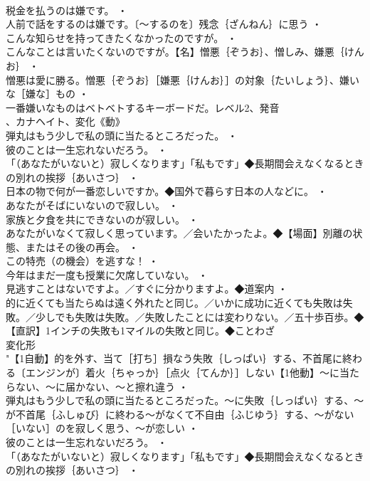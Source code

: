 \documentclass[8pt]{extreport}
\begin{document}
\begin{CJK}{UTF8}{min}
\\	税金を払うのは嫌です。 ・
\\	人前で話をするのは嫌です。〔～するのを〕残念｛ざんねん｝に思う ・
\\	こんな知らせを持ってきたくなかったのですが。 ・
\\	こんなことは言いたくないのですが。【名】憎悪｛ぞうお｝、憎しみ、嫌悪｛けんお｝ ・
\\	憎悪は愛に勝る。憎悪｛ぞうお｝［嫌悪｛けんお｝］の対象｛たいしょう｝、嫌いな［嫌な］もの ・
\\	一番嫌いなものはベトベトするキーボードだ。レベル2、発音
\\	、カナヘイト、変化《動》
\\	弾丸はもう少しで私の頭に当たるところだった。 ・
\\	彼のことは一生忘れないだろう。 ・
\\	「（あなたがいないと）寂しくなります」「私もです」◆長期間会えなくなるときの別れの挨拶｛あいさつ｝ ・
\\	日本の物で何が一番恋しいですか。◆国外で暮らす日本の人などに。 ・
\\	あなたがそばにいないので寂しい。 ・
\\	家族と夕食を共にできないのが寂しい。 ・
\\	あなたがいなくて寂しく思っています。／会いたかったよ。◆【場面】別離の状態、またはその後の再会。 ・
\\	この特売（の機会）を逃すな！ ・
\\	今年はまだ一度も授業に欠席していない。 ・
\\	見逃すことはないですよ。／すぐに分かりますよ。◆道案内 ・
\\	的に近くても当たらぬは遠く外れたと同じ。／いかに成功に近くても失敗は失敗。／少しでも失敗は失敗。／失敗したことには変わりない。／五十歩百歩。◆【直訳】1インチの失敗も1マイルの失敗と同じ。◆ことわざ
\\	変化形 
\\	"【1自動】的を外す、当て［打ち］損なう失敗｛しっぱい｝する、不首尾に終わる〔エンジンが〕着火｛ちゃっか｝［点火｛てんか｝］しない【1他動】～に当たらない、～に届かない、～と擦れ違う ・
\\	弾丸はもう少しで私の頭に当たるところだった。～に失敗｛しっぱい｝する、～が不首尾｛ふしゅび｝に終わる～がなくて不自由｛ふじゆう｝する、～がない［いない］のを寂しく思う、～が恋しい ・
\\	彼のことは一生忘れないだろう。 ・
\\	「（あなたがいないと）寂しくなります」「私もです」◆長期間会えなくなるときの別れの挨拶｛あいさつ｝ ・

\end{CJK}
\end{document}
